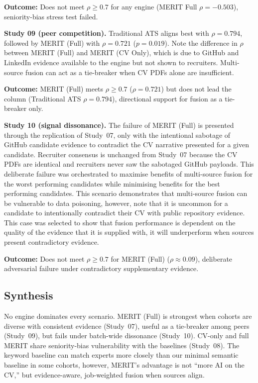 \textbf{Outcome:} Does not meet $\rho \geq 0.7$ for any engine (MERIT Full $\rho = -0.503$), seniority-bias stress test failed.

\textbf{Study 09 (peer competition).}
\label{subsec:study-09-spearman-peer}
Traditional ATS aligns best with $\rho=0.794$, followed by MERIT (Full) with $\rho=0.721$ ($p=0.019$). Note the difference in $\rho$ between
MERIT (Full) and MERIT (CV Only), which is due to GitHub and LinkedIn evidence available to the engine but not shown to recruiters.
Multi-source fusion can act as a tie-breaker when CV PDFs alone are insufficient.

\textbf{Outcome:} MERIT (Full) meets $\rho \geq 0.7$ ($\rho = 0.721$) but does not lead the column (Traditional ATS $\rho = 0.794$), directional support for fusion as a tie-breaker only.

\textbf{Study 10 (signal dissonance).}
\label{subsec:study-10-spearman-dissonance}
The failure of MERIT (Full) is presented through the replication of Study~07, only with the intentional sabotage of
GitHub candidate evidence to contradict the CV narrative presented for a given candidate.
Recruiter consensus is unchanged from Study~07 because the CV PDFs are identical and recruiters never saw the sabotaged GitHub payloads.
This deliberate failure was 
orchestrated to maximise benefits of multi-source fusion for the worst performing candidates while minimising benefits
for the best performing candidates. This scenario demonstrates that multi-source fusion can be vulnerable to data poisoning,
however, note that it is uncommon for a candidate to intentionally contradict their CV with public repository evidence.
This case was selected to show that fusion performance is dependent on the quality of the evidence that it is supplied with,
it will underperform when sources present contradictory evidence.

\textbf{Outcome:} Does not meet $\rho \geq 0.7$ for MERIT (Full) ($\rho \approx 0.09$), deliberate adversarial failure under contradictory supplementary evidence.

\subsection{Synthesis}
\label{subsec:spearman-synthesis}
No engine dominates every scenario. MERIT (Full) is strongest when cohorts are diverse with consistent evidence (Study~07),
useful as a tie-breaker among peers (Study~09), but fails under batch-wide dissonance (Study~10). CV-only and full MERIT share
seniority-bias vulnerability with the baselines (Study~08). The keyword baseline can match experts more closely than our minimal
semantic baseline in some cohorts, however, MERIT's advantage is not ``more AI on the CV,'' but evidence-aware, job-weighted fusion when
sources align.

